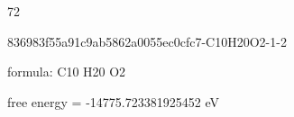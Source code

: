 \documentclass{article}
\begin{document}
72

\vspace{1cm}


836983f55a91c9ab5862a0055ec0cfc7-C10H20O2-1-2



formula: C10 H20 O2



free energy = -14775.723381925452 eV
\end{document}
